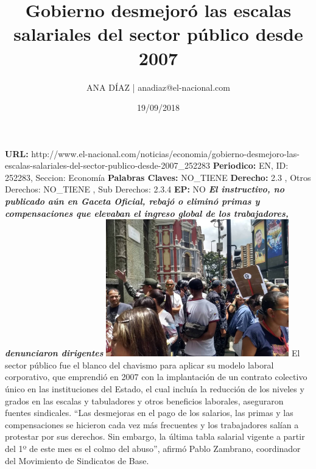 \documentclass{article}%
\title{\textbf{Gobierno desmejoró las escalas salariales del sector público desde 2007}}%
\author{ANA DÍAZ | anadiaz@el{-}nacional.com}%
\date{19/09/2018}%
\begin{document}
%
\normalsize%
\maketitle%
\textbf{URL: }%
http://www.el{-}nacional.com/noticias/economia/gobierno{-}desmejoro{-}las{-}escalas{-}salariales{-}del{-}sector{-}publico{-}desde{-}2007\_252283\newline%
%
\textbf{Periodico: }%
EN, %
ID: %
252283, %
Seccion: %
Economía\newline%
%
\textbf{Palabras Claves: }%
NO\_TIENE\newline%
%
\textbf{Derecho: }%
2.3%
, Otros Derechos: %
NO\_TIENE%
, Sub Derechos: %
2.3.4%
\newline%
%
\textbf{EP: }%
NO\newline%
\newline%
%
\textbf{\textit{El instructivo, no publicado aún en Gaceta Oficial, rebajó o eliminó primas y compensaciones que elevaban el ingreso global de los trabajadores, denunciaron dirigentes}}%
\newline%
\newline%
%
\includegraphics[width=300px]{124.jpg}%
\newline%
%
El sector público fue el blanco del chavismo para aplicar su modelo laboral corporativo, que emprendió en 2007 con la implantación de un contrato colectivo único en las instituciones del Estado, el cual incluía la reducción de los niveles y grados en las escalas y tabuladores y otros beneficios laborales, aseguraron fuentes sindicales.%
\newline%
%
“Las desmejoras en el pago de los salarios, las primas y las compensaciones se hicieron cada vez más frecuentes y los trabajadores salían a protestar por sus derechos. Sin embargo, la última tabla salarial vigente a partir del 1º de este mes es el colmo del abuso”, afirmó Pablo Zambrano, coordinador del Movimiento de Sindicatos de Base.%
\newline%
\end{document}
